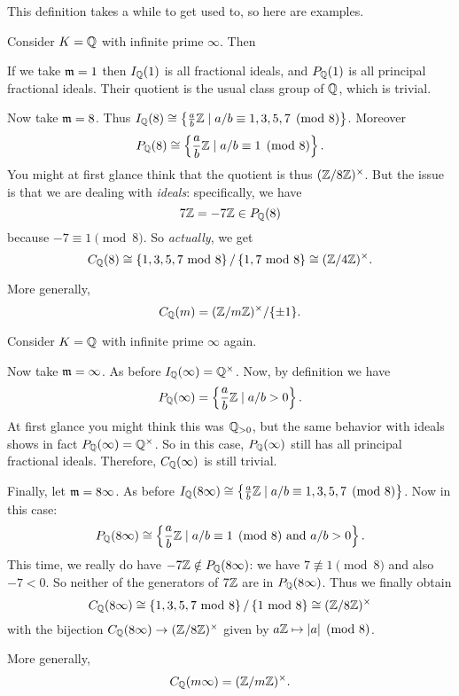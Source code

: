 This definition takes a while to get used to, so here are examples.
\begin{example}
	Consider $K = \mathbb Q$ with infinite prime $\infty$. Then
	\begin{itemize}
		\ii If we take $\mathfrak m = 1$ then $I_\mathbb Q(1)$ is all fractional ideals,
		and $P_\mathbb Q(1)$ is all principal fractional ideals.
		Their quotient is the usual class group of $\mathbb Q$, which is trivial.

		\ii Now take $\mathfrak m = 8$.
		Thus $I_\mathbb Q(8) \cong \left\{ \frac ab\mathbb Z \mid
			a/b \equiv 1,3,5,7 \pmod 8 \right\}$.
		Moreover
		\[ P_\mathbb Q(8) \cong \left\{ \frac ab\mathbb Z \mid
			a/b \equiv 1 \pmod 8 \right\}. \]
		You might at first glance think that
		the quotient is thus $(\mathbb Z/8\mathbb Z)^\times$.
		But the issue is that we are dealing with \emph{ideals}:
		specifically, we have
		\[ 7\mathbb Z = -7\mathbb Z \in P_\mathbb Q(8) \]
		because $-7 \equiv 1 \pmod 8$.
		So \emph{actually}, we get
		\[
			C_\mathbb Q(8)
			\cong \left\{ 1,3,5,7 \text{ mod } 8 \right\}
			/ \left\{ 1,7 \text{ mod } 8 \right\}
			\cong (\mathbb Z/4\mathbb Z)^\times.
		\]
	\end{itemize}
	More generally,
	\[ C_\mathbb Q(m) = (\mathbb Z/m\mathbb Z)^\times / \{\pm1\}. \]
\end{example}
\begin{example}
	Consider $K = \mathbb Q$ with infinite prime $\infty$ again.
	\begin{itemize}
		\ii Now take $\mathfrak m = \infty$.
		As before $I_\mathbb Q(\infty) = \mathbb Q^\times$.
		Now, by definition we have
		\[ P_\mathbb Q(\infty) = \left\{ \frac ab \mathbb Z \mid a/b > 0 \right\}. \]
		At first glance you might think this was $\mathbb Q_{>0}$,
		but the same behavior with ideals shows in fact $P_\mathbb Q(\infty) = \mathbb Q^\times$.
		So in this case, $P_\mathbb Q(\infty)$ still has all principal fractional ideals.
		Therefore, $C_\mathbb Q(\infty)$ is still trivial.

		\ii Finally, let $\mathfrak m = 8\infty$.
		As before $I_\mathbb Q(8\infty) \cong \left\{ \frac ab\mathbb Z \mid
			a/b \equiv 1,3,5,7 \pmod 8 \right\}$.
		Now in this case:
		\[ P_\mathbb Q(8\infty) \cong \left\{ \frac ab\mathbb Z \mid
			a/b \equiv 1 \pmod 8 \text{ and } a/b > 0 \right\}.  \]
		This time, we really do have $-7\mathbb Z \notin P_\mathbb Q(8\infty)$:
		we have $7 \not\equiv 1 \pmod 8$ and also $-7 < 0$.
		So neither of the generators of $7\mathbb Z$ are in $P_\mathbb Q(8\infty)$.
		Thus we finally obtain
		\[
			C_\mathbb Q(8\infty)
			\cong \left\{ 1,3,5,7 \text{ mod } 8 \right\}
			/ \left\{ 1 \text{ mod } 8 \right\}
			\cong (\mathbb Z/8\mathbb Z)^\times
		\]
		with the bijection $C_\mathbb Q(8\infty) \to (\mathbb Z/8\mathbb Z)^\times$
		given by $a\mathbb Z \mapsto |a| \pmod 8$.
	\end{itemize}
	More generally,
	\[ C_\mathbb Q(m\infty) = (\mathbb Z/m\mathbb Z)^\times. \]
\end{example}

